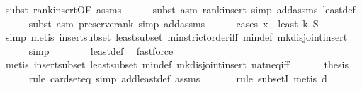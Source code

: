 \begin{isabellebody}
\ {\isacharparenleft}{\kern0pt}subst\ rank{\isacharunderscore}{\kern0pt}insert{\isacharbrackleft}{\kern0pt}OF\ assms{\isacharbrackright}{\kern0pt}{\isacharparenright}{\kern0pt}\isanewline
\ \ \ \ \isamarkupfalse%
\ {\isacharparenleft}{\kern0pt}subst\ {\isacharparenleft}{\kern0pt}asm{\isacharparenright}{\kern0pt}\ rank{\isacharunderscore}{\kern0pt}insert{\isacharcomma}{\kern0pt}\ simp\ add{\isacharcolon}{\kern0pt}assms\ least{\isacharunderscore}{\kern0pt}def{\isacharparenright}{\kern0pt}\isanewline
\ \ \ \ \isamarkupfalse%
\ {\isacharparenleft}{\kern0pt}subst\ {\isacharparenleft}{\kern0pt}asm{\isacharparenright}{\kern0pt}\ preserve{\isacharunderscore}{\kern0pt}rank{\isacharcomma}{\kern0pt}\ simp\ add{\isacharcolon}{\kern0pt}assms{\isacharparenright}{\kern0pt}\isanewline
\ \ \ \ \isamarkupfalse%
\ {\isacharparenleft}{\kern0pt}cases\ {\isachardoublequoteopen}x\ {\isasymin}\ least\ k\ S{\isachardoublequoteclose}{\isacharparenright}{\kern0pt}\isanewline
\ \ \ \ \isamarkupfalse%
\ {\isacharparenleft}{\kern0pt}simp{\isacharcomma}{\kern0pt}\ metis\ insert{\isacharunderscore}{\kern0pt}subset\ least{\isacharunderscore}{\kern0pt}subset\ min{\isachardot}{\kern0pt}strict{\isacharunderscore}{\kern0pt}order{\isacharunderscore}{\kern0pt}iff\ min{\isacharunderscore}{\kern0pt}def\ mk{\isacharunderscore}{\kern0pt}disjoint{\isacharunderscore}{\kern0pt}insert{\isacharparenright}{\kern0pt}\isanewline
\ \ \ \ \isamarkupfalse%
\ {\isacharparenleft}{\kern0pt}simp{\isacharparenright}{\kern0pt}\ \isanewline
\ \ \ \ \ \isamarkupfalse%
\ least{\isacharunderscore}{\kern0pt}def\ \isamarkupfalse%
\ fastforce\isanewline
\ \ \ \ \isamarkupfalse%
\ {\isacharparenleft}{\kern0pt}metis\ insert{\isacharunderscore}{\kern0pt}subset\ least{\isacharunderscore}{\kern0pt}subset\ min{\isacharunderscore}{\kern0pt}def\ mk{\isacharunderscore}{\kern0pt}disjoint{\isacharunderscore}{\kern0pt}insert\ nat{\isacharunderscore}{\kern0pt}neq{\isacharunderscore}{\kern0pt}iff{\isacharparenright}{\kern0pt}\isanewline
\ \ \isanewline
\ \ \isamarkupfalse%
\ {\isacharquery}{\kern0pt}thesis\isanewline
\ \ \ \ \isamarkupfalse%
\ {\isacharparenleft}{\kern0pt}rule\ card{\isacharunderscore}{\kern0pt}seteq{\isacharcomma}{\kern0pt}\ simp\ add{\isacharcolon}{\kern0pt}least{\isacharunderscore}{\kern0pt}def\ assms{\isacharparenright}{\kern0pt}\isanewline
\ \ \ \ \ \isamarkupfalse%
\ {\isacharparenleft}{\kern0pt}rule\ subsetI{\isacharcomma}{\kern0pt}\ metis\ d{\isacharparenright}{\kern0pt}\isanewline

\end{isabellebody}
